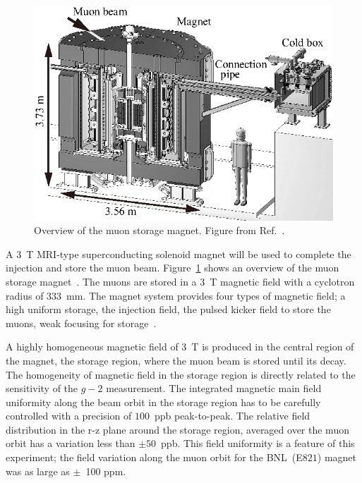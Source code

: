 \begin{figure}[t]
 \centerline{\includegraphics[width=12cm]{Fig/MagnetMechOverviewBW.eps}}
 \caption{Overview of the muon storage magnet. Figure from Ref.~\cite{TDRsummarypaper}.}
\label{fig:magdesign}
\end{figure}

A $3$~T MRI-type superconducting solenoid magnet will be used to complete the injection and store the muon beam.
Figure~\ref{fig:magdesign} shows an overview of the muon storage magnet~\cite{Sasaki-etal-IEEE}.
The muons are stored in a 3~T magnetic field with a cyclotron radius of $333$~mm.
The magnet system provides four types of magnetic field; a high uniform storage,
the injection field, the pulsed kicker field to store the muons, weak focusing for storage~\cite{Abe:2018tmp}.

A highly homogeneous magnetic field of $3$~T is produced
in the central region of the magnet, the storage region, where the muon beam is stored until its decay. 
The homogeneity of magnetic field in the storage region is directly related to the sensitivity of the $g-2$ measurement.
The integrated magnetic main field uniformity along the beam orbit in the storage region has to
be carefully controlled with a precision of $100$~ppb peak-to-peak.
The relative field distribution in the r-z plane around the storage region, averaged over the muon orbit has a variation less than $\pm 50$~ppb. 
This field uniformity is a feature of this experiment; the field variation along the muon orbit for the BNL~(E$821$) magnet was as large as $\pm$~100 ppm.

